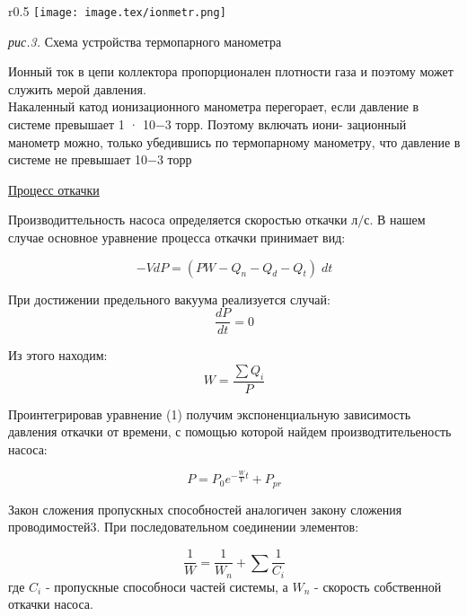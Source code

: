\documentclass{article}
\begin{document}
\begin{wrapfigure}{r}{0.5\textwidth}
    \centering
    \texttt{[image: image.tex/ionmetr.png]}

    \textit{рис.3.} Схема устройства термопарного манометра
\end{wrapfigure}


Ионный ток в цепи коллектора пропорционален плотности газа и поэтому может служить мерой давления.
\\

Накаленный катод ионизационного манометра перегорает, если давление в системе превышает 1 · 10−3 торр. Поэтому включать иони- зационный манометр можно, только убедившись по термопарному манометру, что давление в системе не превышает 10−3 торр

\begin{center}
    \raggedleft
    {
        \large{\underline{Процесс откачки}}
    }
\end{center}

Производиттельность насоса определяется скоростью откачки \(л / с\). В нашем случае основное уравнение процесса откачки принимает вид:

\begin{equation}
    -VdP = (PW - Q_{n} - Q_{d} - Q_{t})\;dt
\end{equation}

При достижении предельного вакуума реализуется случай:
\begin{equation}
    \frac{dP}{dt} = 0
\end{equation}

Из этого находим:
\begin{equation}
    W = \frac{\sum{Q_{i}}}{P}
\end{equation}

Проинтегрировав уравнение (1) получим экспоненциальную зависимость давления откачки от времени, с помощью которой найдем производтительеность насоса:

\begin{equation}
    P = P_{0} e^{-\frac{W}{V}t} + P_{pr}
\end{equation}

Закон сложения пропускных способностей аналогичен закону сложения проводимостей3. При последовательном соединении элементов:

\begin{equation}
    \frac{1}{W} = \frac{1}{W_{n}} + \sum \frac{1}{C_{i}}
\end{equation}
где \(C_{i}\) - пропускные способноси частей системы, а \(W_{n}\) - скорость собственной откачки насоса.
\end{document}
